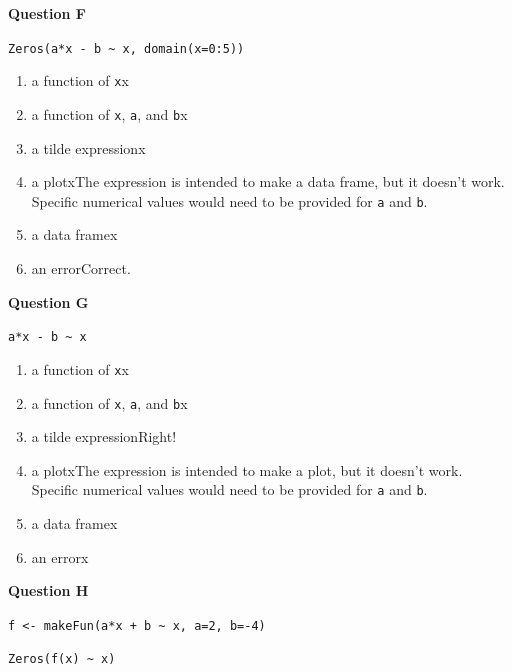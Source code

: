 \documentclass[
  letterpaper,
  DIV=11,
  numbers=noendperiod,
  oneside]{article}
\providecommand{\tightlist}{%
  \setlength{\itemsep}{0pt}\setlength{\parskip}{0pt}}\usepackage{longtable,booktabs,array}
\begin{document}
\begin{multicols}{2}
\textbf{Question F}

\texttt{Zeros(a*x\ -\ b\ \textasciitilde{}\ x,\ domain(x=0:5))}

\begin{enumerate}
\def\labelenumi{\roman{enumi}.}
\tightlist
\item
  {a function of \texttt{x}{x}}\\
\item
  {a function of \texttt{x}, \texttt{a}, and \texttt{b}{x}}\\
\item
  {a tilde expression{x}}\\
\item
  {a plot{xThe expression is intended to make a data frame, but it
  doesn't work. Specific numerical values would need to be provided for
  \texttt{a} and \texttt{b}.}}\\
\item
  {a data frame{x}}\\
\item
  {an error{Correct.~}}
\end{enumerate}

\textbf{Question G}

\texttt{a*x\ -\ b\ \textasciitilde{}\ x}

\begin{enumerate}
\def\labelenumi{\roman{enumi}.}
\tightlist
\item
  {a function of \texttt{x}{x}}\\
\item
  {a function of \texttt{x}, \texttt{a}, and \texttt{b}{x}}\\
\item
  {a tilde expression{Right!~}}\\
\item
  {a plot{xThe expression is intended to make a plot, but it doesn't
  work. Specific numerical values would need to be provided for
  \texttt{a} and \texttt{b}.}}\\
\item
  {a data frame{x}}\\
\item
  {an error{x}}
\end{enumerate}

\textbf{Question H}

\texttt{f\ \textless{}-\ makeFun(a*x\ +\ b\ \textasciitilde{}\ x,\ a=2,\ b=-4)}

\texttt{Zeros(f(x)\ \textasciitilde{}\ x)}


\end{multicols}
\end{document}
